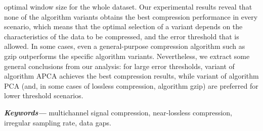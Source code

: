{optimal window size for the whole dataset. Our experimental results reveal that none of the algorithm variants obtains the best compression performance in every scenario, which means that the optimal selection of a variant depends on the characteristics of the data to be compressed, and the error threshold that is allowed. In some cases, even a general-purpose compression algorithm such as gzip outperforms the specific algorithm variants. Nevertheless, we extract some general conclusions from our analysis: for large error thresholds, variant \maskalgo of algorithm APCA achieves the best compression results, while variant \maskalgo of algorithm PCA (and, in some cases of lossless compression, algorithm gzip) are preferred for lower threshold scenarios.

\textbf{\textit{Keywords---}} multichannel signal compression, near-lossless compression, irregular sampling rate, data gaps.

}
\clearpage

% 